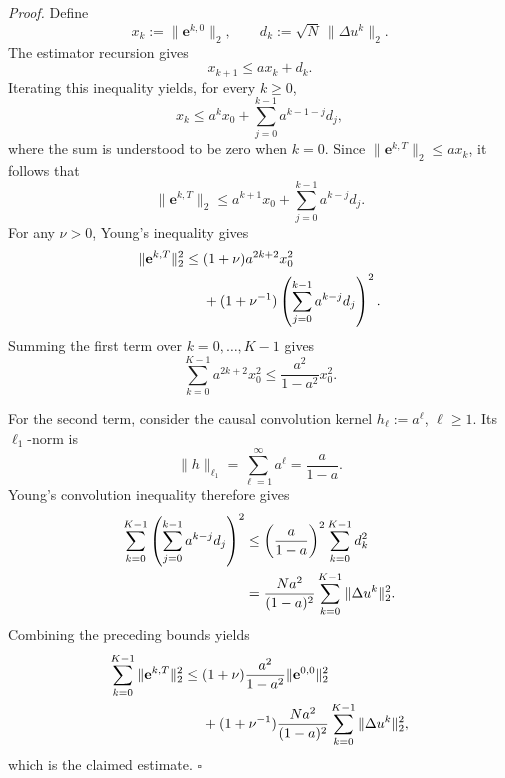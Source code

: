 \documentclass[letterpaper, 10 pt, conference]{ieeeconf} %
\newenvironment{proof}[1][Proof]{\par\noindent\textit{#1. }\ignorespaces}
  {\hfill$\square$\par}
\begin{document}
\begin{proof}
Define
\begin{equation}
x_k:=\|\mathbf e^{k,0}\|_2,
\qquad
d_k:=\sqrt N\,\|\Delta u^k\|_2 .
\end{equation}
The estimator recursion gives
\begin{equation}
x_{k+1}\le a x_k+d_k .
\end{equation}
Iterating this inequality yields, for every \(k\ge 0\),
\begin{equation}
x_k
\le
a^k x_0
+
\sum_{j=0}^{k-1}a^{k-1-j}d_j,
\end{equation}
where the sum is understood to be zero when \(k=0\). Since \(\|\mathbf e^{k,T}\|_2\le a x_k\), it follows that
\begin{equation}
\|\mathbf e^{k,T}\|_2
\le
a^{k+1}x_0
+
\sum_{j=0}^{k-1}a^{k-j}d_j .
\end{equation}
For any \(\nu>0\), Young's inequality gives
\begin{align}
\|\mathbf e^{k,T}\|_2^2
\le{}&
(1+\nu)a^{2k+2}x_0^2 \notag\\
&+
(1+\nu^{-1})
\left(
\sum_{j=0}^{k-1}a^{k-j}d_j
\right)^2 .
\end{align}
Summing the first term over \(k=0,\dots,K-1\) gives
\begin{equation}
\sum_{k=0}^{K-1}a^{2k+2}x_0^2
\le
\frac{a^2}{1-a^2}x_0^2 .
\end{equation}

For the second term, consider the causal convolution kernel \(h_\ell:=a^\ell\), \(\ell\ge1\). Its \(\ell_1\)-norm is
\begin{equation}
\|h\|_{\ell_1}
=
\sum_{\ell=1}^{\infty}a^\ell
=
\frac{a}{1-a}.
\end{equation}
Young's convolution inequality therefore gives
\begin{align}
\sum_{k=0}^{K-1}
\left(
\sum_{j=0}^{k-1}a^{k-j}d_j
\right)^2
&\le
\left(\frac{a}{1-a}\right)^2
\sum_{k=0}^{K-1}d_k^2 \notag\\
&=
\frac{Na^2}{(1-a)^2}
\sum_{k=0}^{K-1}\|\Delta u^k\|_2^2 .
\end{align}
Combining the preceding bounds yields
\begin{align}
\sum_{k=0}^{K-1}\|\mathbf e^{k,T}\|_2^2
\le{}&
(1+\nu)\frac{a^2}{1-a^2}
\|\mathbf e^{0,0}\|_2^2 \notag\\
&+
(1+\nu^{-1})
\frac{Na^2}{(1-a)^2}
\sum_{k=0}^{K-1}\|\Delta u^k\|_2^2,
\end{align}
which is the claimed estimate.
\end{proof}
\end{document}

